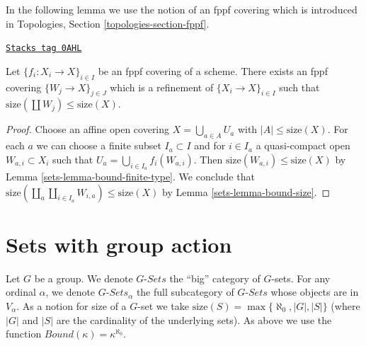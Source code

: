 In the following lemma we use the notion of an fppf covering which
is introduced in Topologies, Section \ref{topologies-section-fppf}.

\begin{lemma}
\label{sets-lemma-bound-fppf-covering}
\href{https://stacks.math.columbia.edu/tag/0AHL}{\texttt{Stacks tag 0AHL}}

Let $\{f_i : X_i \to X\}_{i \in I}$ be an fppf covering of a scheme.
There exists an fppf covering $\{W_j \to X\}_{j \in J}$
which is a refinement of $\{X_i \to X\}_{i \in I}$ such that
$\text{size}(\coprod W_j) \leq \text{size}(X)$.
\end{lemma}

\begin{proof}

Choose an affine open covering $X = \bigcup_{a \in A} U_a$ with
$|A| \leq \text{size}(X)$. For each $a$ we can choose
a finite subset $I_a \subset I$ and for $i \in I_a$ a quasi-compact open
$W_{a, i} \subset X_i$ such that $U_a = \bigcup_{i \in I_a} f_i(W_{a, i})$.
Then $\text{size}(W_{a, i}) \leq \text{size}(X)$ by
Lemma \ref{sets-lemma-bound-finite-type}.
We conclude that
$\text{size}(\coprod_a \coprod_{i \in I_a} W_{i, a}) \leq \text{size}(X)$
by Lemma \ref{sets-lemma-bound-size}.
\end{proof}

\section{Sets with group action}
\label{sets-section-sets-with-group-action}
Let $G$ be a group. We denote $G\textit{-Sets}$ the ``big'' category
of $G$-sets. For any ordinal $\alpha$, we denote
$G\textit{-Sets}_\alpha$ the full subcategory of $G\textit{-Sets}$
whose objects are in $V_\alpha$. As a notion for size of a $G$-set
we take $\text{size}(S) = \max\{\aleph_0, |G|, |S|\}$ (where $|G|$ and
$|S|$ are the cardinality of the underlying sets). As above we use the function
$Bound(\kappa) = \kappa^{\aleph_0}$.

